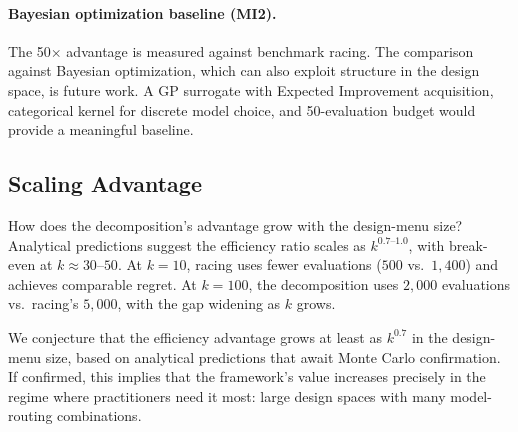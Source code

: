 \paragraph{Bayesian optimization baseline (MI2).}
The 50$\times$ advantage is measured against benchmark racing.
The comparison against Bayesian optimization, which can also exploit structure in the design space, is future work.
A GP surrogate with Expected Improvement acquisition, categorical kernel for discrete model choice, and 50-evaluation budget would provide a meaningful baseline.

\subsection{Scaling Advantage}
\label{sec:scaling}

How does the decomposition's advantage grow with the design-menu size?
Analytical predictions suggest the efficiency ratio scales as $k^{0.7\text{--}1.0}$, with break-even at $k \approx 30\text{--}50$.
At $k = 10$, racing uses fewer evaluations ($500$ vs.\ $1{,}400$) and achieves comparable regret.
At $k = 100$, the decomposition uses $2{,}000$ evaluations vs.\ racing's $5{,}000$, with the gap widening as $k$ grows.

We conjecture that the efficiency advantage grows at least as $k^{0.7}$ in the design-menu size, based on analytical predictions that await Monte Carlo confirmation.
If confirmed, this implies that the framework's value increases precisely in the regime where practitioners need it most: large design spaces with many model-routing combinations.
